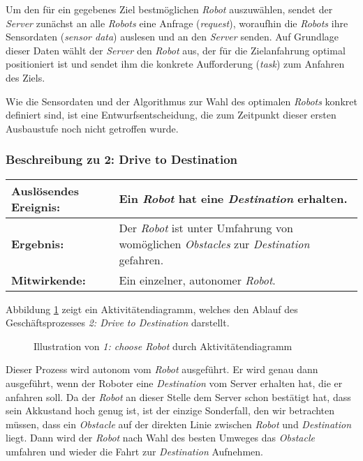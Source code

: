 \documentclass[includeheaders]{scrartcl}
\begin{document}
			Um den für ein gegebenes Ziel bestmöglichen \emph{Robot} auszuwählen, sendet
			der \emph{Server} zunächst an alle \emph{Robots} eine Anfrage (\emph{request}),
			woraufhin die \emph{Robots} ihre Sensordaten (\emph{sensor data}) auslesen und
			an den \emph{Server} senden. Auf Grundlage dieser Daten wählt der \emph{Server} den
			\emph{Robot} aus, der für die Zielanfahrung optimal positioniert ist und
			sendet ihm die konkrete Aufforderung (\emph{task}) zum Anfahren des
			Ziels.

			Wie die Sensordaten und der Algorithmus zur Wahl des optimalen \emph{Robots}
			konkret definiert sind, ist eine Entwurfsentscheidung, die zum Zeitpunkt
			dieser ersten Ausbaustufe noch nicht getroffen wurde.

			\subsubsection*{Beschreibung zu 2: Drive to Destination}

			\begin{table}[H]
				\centering
				\begin{tabularx}{\textwidth}{@{}p{3cm}X@{}}
				\toprule
				\textbf{Auslösendes Ereignis:} & Ein \emph{Robot} hat eine \emph{Destination} erhalten.\\ \midrule
				\textbf{Ergebnis:} & Der \emph{Robot} ist unter Umfahrung von womöglichen \emph{Obstacles} zur \emph{Destination} gefahren.\\ \midrule
				\textbf{Mitwirkende:} &	Ein einzelner, autonomer \emph{Robot}. \\
				\bottomrule
				\end{tabularx}
				\label{tab:2-4-drive-to-destination}
			\end{table}

			Abbildung \ref{fig:2-4-drive-to-destination-aktivitaetendiagramm} zeigt ein Aktivitätendiagramm, welches den Ablauf des Geschäftsprozesses \emph{2: Drive to Destination} darstellt.
			
			\begin{figure}[H]
				\centering
				\caption{Illustration von \emph{1: choose Robot} durch Aktivitätendiagramm}
				\label{fig:2-4-drive-to-destination-aktivitaetendiagramm}
			\end{figure}

			Dieser Prozess wird autonom vom \emph{Robot} ausgeführt. Er wird genau
			dann ausgeführt, wenn der Roboter eine \emph{Destination} vom Server
			erhalten hat, die er anfahren soll. Da der \emph{Robot} an dieser Stelle
			dem Server schon bestätigt hat, dass sein Akkustand hoch genug ist, ist
			der einzige Sonderfall, den wir betrachten müssen, dass ein
			\emph{Obstacle} auf der direkten Linie zwischen \emph{Robot} und
			\emph{Destination} liegt. Dann wird der \emph{Robot} nach Wahl des
			besten Umweges das \emph{Obstacle} umfahren und wieder die Fahrt zur
			\emph{Destination} Aufnehmen.
			
\end{document}
